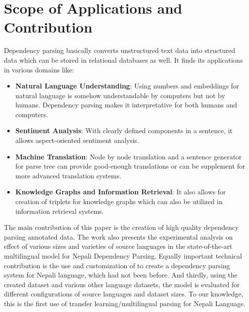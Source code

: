 \section {Scope of Applications and Contribution}
Dependency parsing basically converts unstructured text data into structured
data which can be stored in relational databases as well. It finds its
applications in various domains like:
\begin{itemize}
    \item \textbf{Natural Language Understanding}: Using numbers and embeddings
        for natural language is somehow understandable by computers but not by
        humans. Dependency parsing makes it interpretative for both humans and computers.
    \item \textbf{Sentiment Analysis}: With clearly defined components in a
        sentence, it allows aspect-oriented sentiment analysis.
    \item \textbf{Machine Translation}: Node by node translation and a sentence
        generator for parse tree can provide good-enough translations or can be
        supplement for more advanced translation systems.
    \item \textbf{Knowledge Graphs and Information Retrieval}: It also allows
        for creation of triplets for knowledge graphs which can also be
        utilized in information retrieval systems.
\end{itemize}

The main contribution of this paper is the creation of high quality dependency
parsing annotated data. The work also presents the experimental analysis on
effect of various sizes and varieties of source languages in the
state-of-the-art multilingual model \cite{steps-parser} for Nepali Dependency
Parsing. Equally important technical contribution is the use and customization
of \cite{steps-parser} to create a dependency parsing system for Nepali
language, which had not been before. And thirdly, using the created dataset and
various other language datasets, the model is evaluated for different
configurations of source languages and dataset sizes. To our knowledge, this is
the first use of transfer learning/multilingual parsing for Nepali Language.

